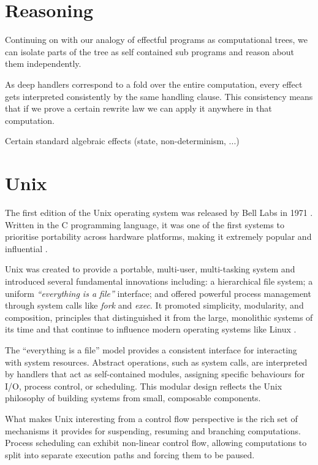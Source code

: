 \documentclass[logo,bsc,singlespacing,parskip]{infthesis}
\begin{document}
\section{Reasoning}
Continuing on with our analogy of effectful programs as computational trees, we can isolate parts of the tree as self contained sub programs and reason about them independently. 


As deep handlers correspond to a fold over the entire computation, every effect gets interpreted consistently by the same handling clause. This consistency means that if we prove a certain rewrite law we can apply it anywhere in that computation. 

Certain standard algebraic effects (state, non-determinism, ...) 

\section{Unix}
The first edition of the Unix operating system was released by Bell Labs in 1971 \cite{ritchie1974unix}. Written in the C programming language, it was one of the first systems to prioritise portability across hardware platforms, making it extremely popular and influential \cite{blair1985critique}.

Unix was created to provide a portable, multi-user, multi-tasking system and introduced several fundamental innovations including: a hierarchical file system; a uniform \textit{“everything is a file”} interface; and offered powerful process management through system calls like \textit{fork} and \textit{exec}.  It promoted simplicity, modularity, and composition, principles that distinguished it from the large, monolithic systems of its time and that continue to influence modern operating systems like Linux \cite{gancarz2003linux}.

The “everything is a file” model provides a consistent interface for interacting with system resources. Abstract operations, such as system calls, are interpreted by handlers that act as self-contained modules, assigning specific behaviours for I/O, process control, or scheduling. This modular design reflects the Unix philosophy\cite{raymond2003art} of building systems from small, composable components.

What makes Unix interesting from a control flow perspective is the rich set of mechanisms it provides for suspending, resuming and branching computations\cite{stevens2013advanced}. Process scheduling can exhibit non-linear control flow, allowing computations to split into separate execution paths and forcing them to be paused.
\end{document}
